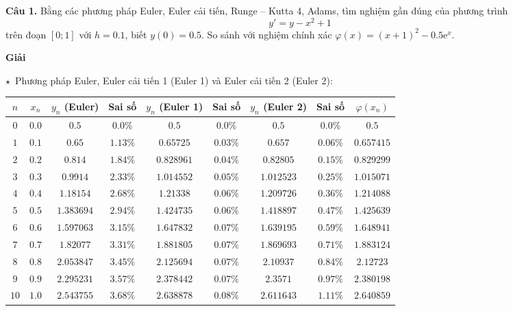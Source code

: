 \textbf{Câu 1.} Bằng các phương pháp Euler, Euler cải tiến, Runge – Kutta 4, Adams, tìm nghiệm gần đúng của phương trình $$y'=y-x^2+1$$ trên đoạn $[0;1]$ với $h=0.1$, biết $y(0)=0.5$. So sánh với nghiệm chính xác $\varphi(x)=(x+1)^2-0.5\mathrm{e}^x$.\par
\textbf{Giải}\par
$\star$~Phương pháp Euler, Euler cải tiến 1 (Euler 1) và Euler cải tiến 2 (Euler 2):
\begin{longtable}{|c|c|c|c|c|c|c|c|c|}\hline
	$n$  & $x_n$ & $y_n$ (Euler) & Sai số & $y_n$ (Euler 1) & Sai số & $y_n$ (Euler 2) & Sai số & $\varphi(x_n)$ \\\hline
	\endhead
	$0$  & $0.0$ & $0.5$         & $0.0\%$  & $0.5$           & $0.0\%$  & $0.5$           & $0.0\%$  & $0.5$          \\\hline
	$1$  & $0.1$ & $0.65$        & $1.13\%$ & $0.65725$       & $0.03\%$ & $0.657$         & $0.06\%$ & $0.657415$     \\\hline
	$2$  & $0.2$ & $0.814$       & $1.84\%$ & $0.828961$      & $0.04\%$ & $0.82805$       & $0.15\%$ & $0.829299$     \\\hline
	$3$  & $0.3$ & $0.9914$      & $2.33\%$ & $1.014552$      & $0.05\%$ & $1.012523$      & $0.25\%$ & $1.015071$     \\\hline
	$4$  & $0.4$ & $1.18154$     & $2.68\%$ & $1.21338$       & $0.06\%$ & $1.209726$      & $0.36\%$ & $1.214088$     \\\hline
	$5$  & $0.5$ & $1.383694$    & $2.94\%$ & $1.424735$      & $0.06\%$ & $1.418897$      & $0.47\%$ & $1.425639$     \\\hline
	$6$  & $0.6$ & $1.597063$    & $3.15\%$ & $1.647832$      & $0.07\%$ & $1.639195$      & $0.59\%$ & $1.648941$     \\\hline
	$7$  & $0.7$ & $1.82077$     & $3.31\%$ & $1.881805$      & $0.07\%$ & $1.869693$      & $0.71\%$ & $1.883124$     \\\hline
	$8$  & $0.8$ & $2.053847$    & $3.45\%$ & $2.125694$      & $0.07\%$ & $2.10937$       & $0.84\%$ & $2.12723$      \\\hline
	$9$  & $0.9$ & $2.295231$    & $3.57\%$ & $2.378442$      & $0.07\%$ & $2.3571$        & $0.97\%$ & $2.380198$     \\\hline
	$10$ & $1.0$ & $2.543755$    & $3.68\%$ & $2.638878$      & $0.08\%$ & $2.611643$      & $1.11\%$ & $2.640859$     \\\hline
\end{longtable}

